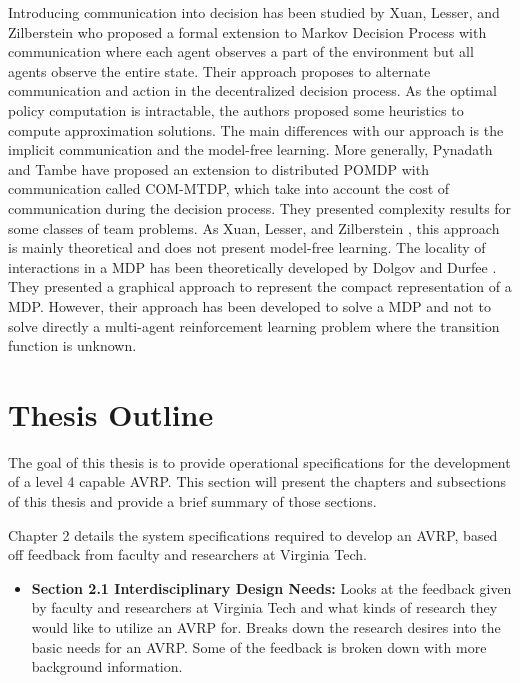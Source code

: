 Introducing communication into decision has been studied by Xuan, Lesser, and Zilberstein \cite{Multi-agentCooperation2001} who proposed a formal extension to Markov Decision Process with communication where each agent observes a part of the environment but all agents observe the entire state. Their approach proposes to alternate communication and action in the decentralized decision process. As the optimal policy computation is intractable, the authors proposed some heuristics to compute approximation solutions. The main differences with our approach is the implicit communication and the model-free learning. More generally, Pynadath and Tambe \cite{Communicative2002} have proposed an extension to distributed POMDP with communication called COM-MTDP, which take into account the cost of communication during the decision process. They presented complexity results for some classes of team problems. As Xuan, Lesser, and Zilberstein \cite{Multi-agentCooperation2001}, this approach is mainly theoretical and does not present model-free learning. The locality of interactions in a MDP has been theoretically developed by Dolgov and Durfee \cite{Makov2004}. They presented a graphical approach to represent the compact representation of a MDP. However, their approach has been developed to solve a MDP and not to solve directly a multi-agent reinforcement learning problem where the transition function is unknown.


\section{Thesis Outline}

The goal of this thesis is to provide operational specifications for the development of a level 4 capable AVRP. This section will present the chapters and subsections of this thesis and provide a brief summary of those sections.

Chapter 2 details the system specifications required to develop an AVRP, based off feedback from faculty and researchers at Virginia Tech.
\begin{itemize}
\item \textbf {Section 2.1 Interdisciplinary Design Needs:} Looks at the feedback given by faculty and researchers at Virginia Tech and what kinds of research they would like to utilize an AVRP for. Breaks down the research desires into the basic needs for an AVRP. Some of the feedback is broken down with more background information.
\end{itemize}

